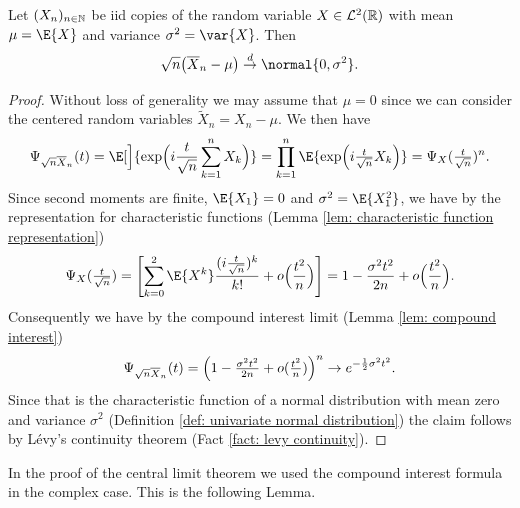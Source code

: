 \begin{mdframed}[innertopmargin=0pt]
\begin{theorem}
    \label{thm: univariate central limit theorem}
    Let \((X_n)_{n\in \mathbb{N}}\) be iid copies of the random variable \(X\in
    \mathcal{L}^2(\mathbb{R})\) with mean \(\mu = \E{X}\) and variance \(\sigma^2 =
    \var{X}\). Then
    \[
        \sqrt{n}\bigl(\mean{X}_n - \mu\bigr)
        \overset{d}\to \normal{0, \sigma^2}.
    \]
\end{theorem}
\end{mdframed}

\begin{proof}
    Without loss of generality we may assume that \(\mu=0\) since we can
    consider the centered random variables \(\tilde{X}_n = X_n - \mu\).
    We then have
    \[
        \charFct_{\sqrt{n} \mean{X}_n}(t)
        = \E[\Big]{\exp\Bigl(i \frac{t}{\sqrt{n}} \sum_{k=1}^n X_k\Bigr)}
        = \prod_{k=1}^n \E{\exp\Bigl(i \tfrac{t}{\sqrt{n}} X_k\Bigr)}
        = \charFct_{X}(\tfrac{t}{\sqrt{n}})^n.
    \]
    Since second moments are finite, \(\E{X_1} = 0\) and \(\sigma^2 =
    \E{X_1^2}\), we have by the representation for characteristic functions
    (Lemma \ref{lem: characteristic function representation})
    \[
        \charFct_X(\tfrac{t}{\sqrt{n}})
        = \Biggl[\sum_{k=0}^2 \E{X^k}\frac{(i\frac{t}{\sqrt{n}})^k}{k!} + o\Bigl(\frac{t^2}{n}\Bigr)\Biggr]
        = 1 - \frac{\sigma^2 t^2}{2 n} + o\Bigl(\frac{t^2}{n}\Bigr).
    \]
    Consequently we have by the compound interest limit (Lemma \ref{lem: compound interest})
    \[
        \Psi_{\sqrt{n} \overline{X}_n}(t)
        = \Bigl(1 - \tfrac{\sigma^2 t^2}{2 n} + o(\tfrac{t^2}{n})\Bigr)^n
        \to e^{-\frac12 \sigma^2 t^2}.
    \]
    Since that is the characteristic function of a normal distribution
    with mean zero and variance \(\sigma^2\) (Definition \ref{def: univariate
    normal distribution}) the claim follows by Lévy's continuity theorem (Fact \ref{fact: levy continuity}).
\end{proof}

In the proof of the central limit theorem we used the compound interest
formula in the complex case. This is the following Lemma.


